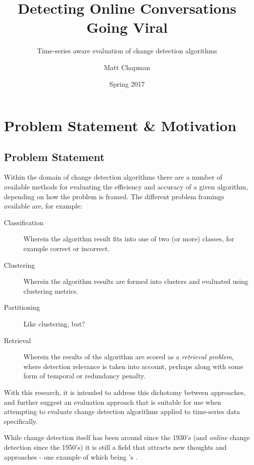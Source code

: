 \documentclass{uvamscse}	%
\title{Detecting Online Conversations Going Viral}
\subtitle{Time-series aware evaluation of change detection algorithms}
\date{Spring 2017}
\author{Matt Chapman}
\begin{document}
\nocite{*}
\maketitle


\chapter{Problem Statement \& Motivation}

\section{Problem Statement}

Within the domain of change detection algorithms there are a number of available methods for evaluating the efficiency and accuracy of a given algorithm, depending on how the problem is framed. The different problem framings available are, for example:

\begin{description}
	\item[Classification] Wherein the algorithm result fits into one of two (or more) classes, for example correct or incorrect.
	\item[Clustering] Wherein the algorithm results are formed into clusters and evaluated using clustering metrics.
	\item[Partitioning] Like clustering, but?
	\item[Retrieval] Wherein the results of the algorithm are scored as a \emph{retrieval problem}, where detection relevance is taken into account, perhaps along with some form of temporal or redundancy penalty.
\end{description}

With this research, it is intended to address this dichotomy between approaches, and further suggest an evaluation approach that is suitable for use when attempting to evaluate change detection algorithms applied to time-series data specifically.

While change detection itself has been around since the 1930's (and \emph{online} change detection since the 1950's) it is still a field that attracts new thoughts and approaches - one example of which being \citeauthor{Ginsberg2009}'s  \cite{Ginsberg2009}.
\end{document}
